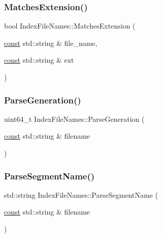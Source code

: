 \subsubsection{\texorpdfstring{Matches\+Extension()}{MatchesExtension()}}
{\footnotesize\ttfamily bool Index\+File\+Names\+::\+Matches\+Extension (\begin{DoxyParamCaption}\item[{\mbox{\hyperlink{ZlibCrc32_8h_a2c212835823e3c54a8ab6d95c652660e}{const}} std\+::string \&}]{file\+\_\+name,  }\item[{\mbox{\hyperlink{ZlibCrc32_8h_a2c212835823e3c54a8ab6d95c652660e}{const}} std\+::string \&}]{ext }\end{DoxyParamCaption})\hspace{0.3cm}{\ttfamily [static]}}

\mbox{\label{classlucene_1_1core_1_1index_1_1IndexFileNames_a4e9fe2bd5da0cf8dfd38f0ee90caa302}} 
\subsubsection{\texorpdfstring{Parse\+Generation()}{ParseGeneration()}}
{\footnotesize\ttfamily uint64\+\_\+t Index\+File\+Names\+::\+Parse\+Generation (\begin{DoxyParamCaption}\item[{\mbox{\hyperlink{ZlibCrc32_8h_a2c212835823e3c54a8ab6d95c652660e}{const}} std\+::string \&}]{filename }\end{DoxyParamCaption})\hspace{0.3cm}{\ttfamily [static]}}

\mbox{\label{classlucene_1_1core_1_1index_1_1IndexFileNames_a677cddeb80a0f482875f759ea8856ee9}} 
\subsubsection{\texorpdfstring{Parse\+Segment\+Name()}{ParseSegmentName()}}
{\footnotesize\ttfamily std\+::string Index\+File\+Names\+::\+Parse\+Segment\+Name (\begin{DoxyParamCaption}\item[{\mbox{\hyperlink{ZlibCrc32_8h_a2c212835823e3c54a8ab6d95c652660e}{const}} std\+::string \&}]{filename }\end{DoxyParamCaption})\hspace{0.3cm}{\ttfamily [static]}}

